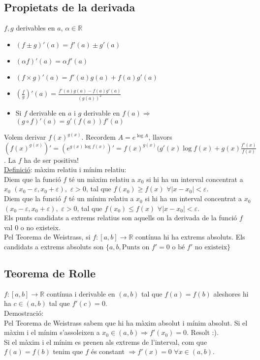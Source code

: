 \subsection{Propietats de la derivada}
$f, g$ derivables en $a$, $\alpha \in \mathbb{R}$
\begin{itemize}
    \item $(f \pm g)'(a) = f'(a) \pm g'(a)$
    \item $(\alpha f)'(a) = \alpha f'(a)$
    \item $(f\times g)'(a) = f'(a)g(a) + f(a)g'(a)$
    \item $(\frac{f}{g})'(a) = \frac{f'(a)g(a) - f(a)g'(a)}{(g(a))^2}$
    \item Si $f$ derivable en $a$ i $g$ derivable en $f(a) \Rightarrow$ $(g \circ f)'(a) = g'(f(a))f'(a)$
\end{itemize}
Volem derivar $f(x)^{g(x)}$. Recordem $A = e^{\log{A}}$, llavors $(f(x)^{g(x)})' = (e^{g(x)\log{f(x)}})' = f(x)^{g(x)}(g'(x)\log{f(x)} + g(x) \frac{f'(x)}{f(x)}$. La $f$ ha de ser positiva!\\
\underline{Definició}: màxim relatiu i mínim relatiu:\\
Diem que la funció $f$ té un màxim relatiu a $x_0$ si hi ha un interval concentrat a $x_0$ $(x_0 - \varepsilon, x_0 + \varepsilon),$ $\varepsilon > 0$, tal que $f(x_0) \geq f(x)$ $\forall |x - x_0| < \varepsilon$.\\
Diem que la funció $f$ té un mínim relatiu a $x_0$ si hi ha un interval concentrat a $x_0$ $(x_0 - \varepsilon, x_0 + \varepsilon),$ $\varepsilon > 0$, tal que $f(x_0) \leq f(x)$ $\forall |x - x_0| < \varepsilon$.\\
Els punts candidats a extrems relatius son aquells on la derivada de la funció $f$ val $0$ o no existeix.\\
Pel Teorema de Weistrass, si $f: [a, b] \rightarrow \mathbb{R}$ contínua hi ha extrems absoluts. Els candidats a extrems absoluts son $\{a, b, \text{Punts on } f'=0 \text{ o bé } f' \text{ no existeix}\}$
\subsection{Teorema de Rolle}
$f: [a, b] \rightarrow \mathbb{R}$ contínua i derivable en $(a, b)$ tal que $f(a) = f(b)$ aleshores hi ha $c \in (a, b)$ tal que $f'(c) = 0$.\\
Demostració:\\
Pel Teorema de Weistrass sabem que hi ha màxim absolut i mínim absolut. Si el màxim i el mínim s'assoleixen a $x_0 \in (a, b) \Rightarrow f'(x_0) = 0$. Resolt :).\\
Si el màxim i el mínim es prenen als extrems de l'interval, com que $f(a)=f(b)$ tenim que $f$ és constant $\Rightarrow f'(x) = 0$ $\forall x \in (a, b)$.
